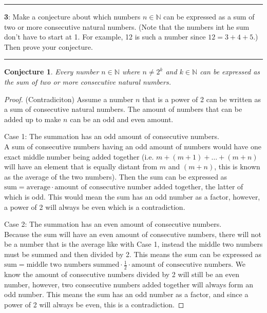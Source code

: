 \documentclass[11pt]{article}
\newcommand\question[2]{\vspace{.25in}\hrule\textbf{#1}: #2\vspace{.5em}\hrule\vspace{.10in}}
\newcommand{\N}{\mathbb{N}}
\newtheorem{conjecture}[theorem]{Conjecture }
\begin{document}
\question{3}{Make a conjecture about which numbers $n \in \N$ can be expressed as a sum of two or more consecutive natural numbers. (Note that the numbers int he sum don't have to start at 1. For example, 12 is such a number since $12 = 3 + 4 + 5$.) Then prove your conjecture.}

\begin{conjecture}
	Every number $n \in \N$ where $n \ne 2^k$ and $k \in \N$ can be expressed as the sum of two or more consecutive natural numbers.
\end{conjecture}

\begin{proof}
	(Contradiciton) Assume a number $n$ that is a power of 2 can be written as a sum of consecutive natural numbers. The amount of numbers that can be added up to make $n$ can be an odd and even amount.

	Case 1: The summation has an odd amount of consecutive numbers.\\
	A sum of consecutive numbers having an odd amount of numbers would have one exact middle number being added together (i.e. $m + (m+1) + \ldots + (m+n)$ will have an element that is equally distant from $m$ and $(m+n)$, this is known as the average of the two numbers). Then the sum can be expressed as $\text{sum} = \text{average} \cdot \text{amount of consecutive number added together}$, the latter of which is odd. This would mean the sum has an odd number as a factor, however, a power of 2 will always be even which is a contradiction.

	Case 2: The summation has an even amount of consecutive numbers.\\
	Because the sum will have an even amount of consecutive numbers, there will not be a number that is the average like with Case 1, instead the middle two numbers must be summed and then divided by 2. This means the sum can be expressed as $\text{sum} = \text{middle two numbers summed} \cdot \frac{1}{2} \cdot \text{amount of consecutive numbers}$. We know the amount of consecutive numbers divided by 2 will still be an even number, however, two consecutive numbers added together will always form an odd number. This means the sum has an odd number as a factor, and since a power of 2 will always be even, this is a contradiction.
\end{proof}





	
\end{document}
